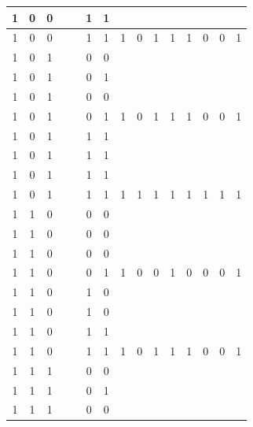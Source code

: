 \begin{table}[!tb]
\begin{tabular}{|c|c|c|c|c|c|c|c|c|c|c|c|c|c|c|}
        \rowcolor{yellow!40} 1 & 0 & 0 &  &  & 1 & 1 &  &  &  &  &  &  &  &  \\ \hline
        \rowcolor{yellow!40} 1 & 0 & 0 &  &  & 1 & 1 & 1 & 0 & 1 & 1 & 1 & 0 & 0 & 1 \\ \hline
        \rowcolor{gray!40} 1 & 0 & 1 &  &  & 0 & 0 &  &  &  &  &  &  &  &  \\ \hline
        \rowcolor{gray!40} 1 & 0 & 1 &  &  & 0 & 1 &  &  &  &  &  &  &  &  \\ \hline
        \rowcolor{gray!40} 1 & 0 & 1 &  &  & 0 & 0 &  &  &  &  &  &  &  &  \\ \hline
        \rowcolor{gray!40} 1 & 0 & 1 &  &  & 0 & 1 & 1 & 0 & 1 & 1 & 1 & 0 & 0 & 1 \\ \hline
        \rowcolor{blue!40} 1 & 0 & 1 &  &  & 1 & 1 &  &  &  &  &  &  &  &  \\ \hline
        \rowcolor{blue!40} 1 & 0 & 1 &  &  & 1 & 1 &  &  &  &  &  &  &  &  \\ \hline
        \rowcolor{blue!40} 1 & 0 & 1 &  &  & 1 & 1 &  &  &  &  &  &  &  &  \\ \hline
        \rowcolor{blue!40} 1 & 0 & 1 &  &  & 1 & 1 & 1 & 1 & 1 & 1 & 1 & 1 & 1 & 1 \\ \hline
        \rowcolor{red!40} 1 & 1 & 0 &  &  & 0 & 0 &  &  &  &  &  &  &  &  \\ \hline
        \rowcolor{red!40} 1 & 1 & 0 &  &  & 0 & 0 &  &  &  &  &  &  &  &  \\ \hline
        \rowcolor{red!40} 1 & 1 & 0 &  &  & 0 & 0 &  &  &  &  &  &  &  &  \\ \hline
        \rowcolor{red!40} 1 & 1 & 0 &  &  & 0 & 1 & 1 & 0 & 0 & 1 & 0 & 0 & 0 & 1 \\ \hline
        \rowcolor{green!40} 1 & 1 & 0 &  &  & 1 & 0 &  &  &  &  &  &  &  &  \\ \hline
        \rowcolor{green!40} 1 & 1 & 0 &  &  & 1 & 0 &  &  &  &  &  &  &  &  \\ \hline
        \rowcolor{green!40} 1 & 1 & 0 &  &  & 1 & 1 &  &  &  &  &  &  &  &  \\ \hline
        \rowcolor{green!40} 1 & 1 & 0 &  &  & 1 & 1 & 1 & 0 & 1 & 1 & 1 & 0 & 0 & 1 \\ \hline
        \rowcolor{yellow!40} 1 & 1 & 1 &  &  & 0 & 0 &  &  &  &  &  &  &  &  \\ \hline
        \rowcolor{yellow!40} 1 & 1 & 1 &  &  & 0 & 1 &  &  &  &  &  &  &  &  \\ \hline
        \rowcolor{yellow!40} 1 & 1 & 1 &  &  & 0 & 0 &  &  &  &  &  &  &  &  \\ \hline

\end{tabular}
\end{table}
